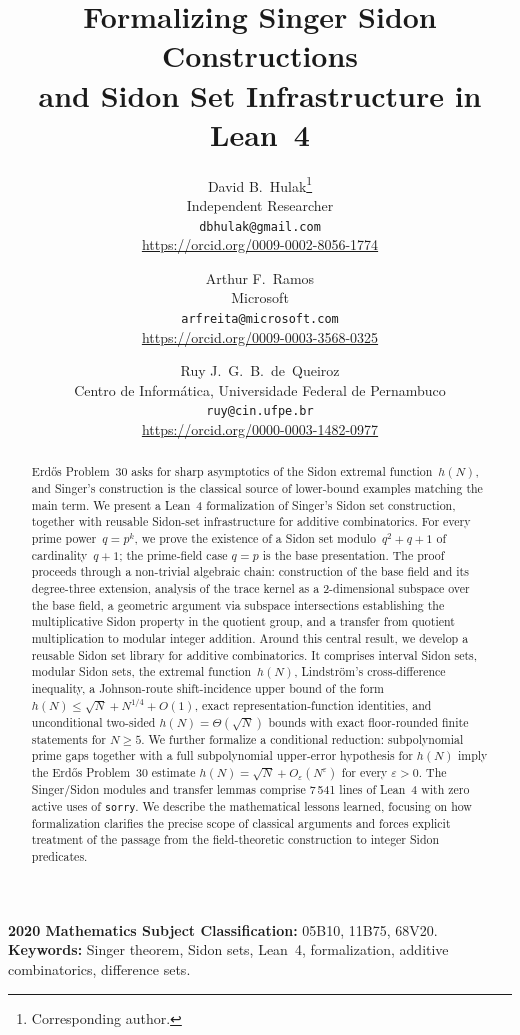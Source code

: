\documentclass[11pt,a4paper]{article}
\title{Formalizing Singer Sidon Constructions\\
and Sidon Set Infrastructure in Lean~4}
\author{David B.~Hulak\thanks{Corresponding author.}\\
\small Independent Researcher\\
\small \texttt{dbhulak@gmail.com}\\
\small \url{https://orcid.org/0009-0002-8056-1774}
\and
Arthur F.~Ramos\\
\small Microsoft\\
\small \texttt{arfreita@microsoft.com}\\
\small \url{https://orcid.org/0009-0003-3568-0325}
\and
Ruy J.~G.~B.~de~Queiroz\\
\small Centro de Inform\'atica, Universidade Federal de Pernambuco\\
\small \texttt{ruy@cin.ufpe.br}\\
\small \url{https://orcid.org/0000-0003-1482-0977}}
\date{}
\begin{document}
\maketitle

\begin{abstract}
Erd\H{o}s Problem~30 asks for sharp asymptotics of the Sidon extremal
function~$h(N)$, and Singer's construction is the classical source of
lower-bound examples matching the main term.  We present a Lean~4 formalization of Singer's
Sidon set construction, together with reusable Sidon-set
infrastructure for additive combinatorics.  For every prime power~$q=p^k$, we prove the existence of a Sidon set
modulo~$q^2+q+1$ of cardinality~$q+1$; the prime-field case \(q=p\) is the
base presentation.  The proof proceeds through a
non-trivial algebraic chain:
construction of the base field and its degree-three extension, analysis of the trace
kernel as a 2-dimensional subspace over the base field, a geometric argument via subspace
intersections establishing the multiplicative Sidon property in the quotient
group, and a transfer from quotient multiplication to modular integer addition.
Around this central result, we develop a reusable Sidon set
library for additive combinatorics.  It comprises interval Sidon sets, modular
Sidon sets, the extremal function~$h(N)$, Lindstr\"om's cross-difference
inequality, a Johnson-route shift-incidence upper bound of the form
$h(N) \le \sqrt N + N^{1/4} + O(1)$, exact
representation-function identities, and unconditional two-sided
\(h(N)=\Theta(\sqrt N)\) bounds with exact floor-rounded finite statements for
\(N \ge 5\).  We further formalize a conditional reduction:
subpolynomial prime gaps together with a full subpolynomial upper-error
hypothesis for \(h(N)\) imply the Erd\H{o}s Problem~30 estimate
$h(N) = \sqrt{N} + O_\varepsilon(N^\varepsilon)$ for every
$\varepsilon>0$.  The Singer/Sidon modules and transfer lemmas
comprise 7\,541 lines of Lean~4 with zero active uses of \texttt{sorry}.
We describe the
mathematical lessons learned, focusing on how formalization clarifies the precise
scope of classical arguments and forces explicit treatment of the
passage from the field-theoretic construction to integer Sidon predicates.
\end{abstract}

\smallskip\noindent\textbf{2020 Mathematics Subject Classification:}
05B10, 11B75, 68V20.\\
\textbf{Keywords:} Singer theorem, Sidon sets, Lean~4, formalization,
additive combinatorics, difference sets.
\end{document}
